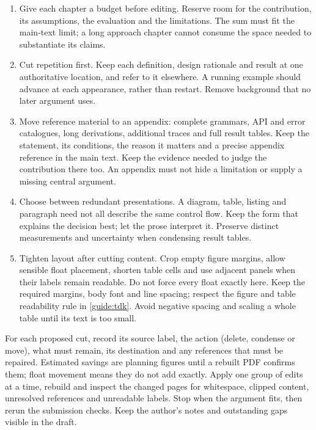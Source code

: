 \begin{enumerate}
  \item Give each chapter a budget before editing. Reserve room for the
  contribution, its assumptions, the evaluation and the limitations. The
  sum must fit the main-text limit; a long approach chapter cannot consume
  the space needed to substantiate its claims.
  \item Cut repetition first. Keep each definition, design rationale and
  result at one authoritative location, and refer to it elsewhere. A
  running example should advance at each appearance, rather than restart.
  Remove background that no later argument uses.
  \item Move reference material to an appendix: complete grammars, API and
  error catalogues, long derivations, additional traces and full result
  tables. Keep the statement, its conditions, the reason it matters and a
  precise appendix reference in the main text. Keep the evidence needed to
  judge the contribution there too. An appendix must not hide a limitation
  or supply a missing central argument.
  \item Choose between redundant presentations. A diagram, table, listing
  and paragraph need not all describe the same control flow. Keep the form
  that explains the decision best; let the prose interpret it. Preserve
  distinct measurements and uncertainty when condensing result tables.
  \item Tighten layout after cutting content. Crop empty figure margins,
  allow sensible float placement, shorten table cells and use adjacent
  panels when their labels remain readable. Do not force every float
  exactly here. Keep the required margins, body font and line spacing;
  respect the figure and table readability rule in \cref{guide:tdk}. Avoid
  negative spacing and scaling a whole table until its text is too small.
\end{enumerate}

For each proposed cut, record its source label, the action (delete,
condense or move), what must remain, its destination and any references
that must be repaired. Estimated savings are planning figures until a
rebuilt PDF confirms them; float movement means they do not add exactly.
Apply one group of edits at a time, rebuild and inspect the changed pages
for whitespace, clipped content, unresolved references and unreadable
labels. Stop when the argument fits, then rerun the submission checks.
Keep the author's notes and outstanding gaps visible in the draft.
